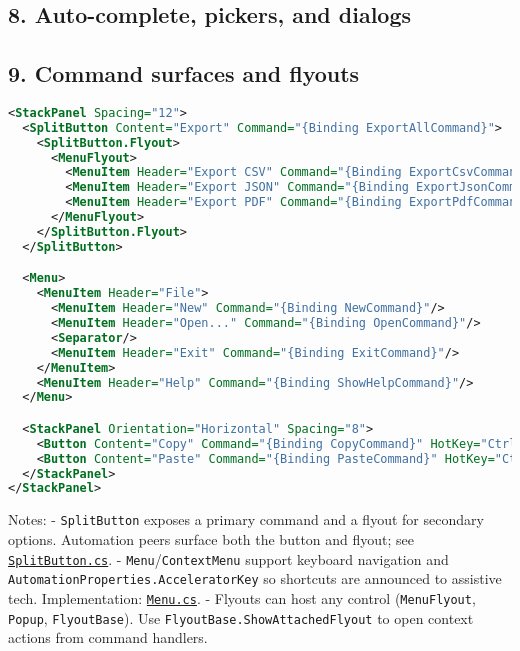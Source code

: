 \subsection{8. Auto-complete, pickers, and
dialogs}\label{auto-complete-pickers-and-dialogs}

\subsection{9. Command surfaces and
flyouts}\label{command-surfaces-and-flyouts}

\begin{lstlisting}[language=XML]
<StackPanel Spacing="12">
  <SplitButton Content="Export" Command="{Binding ExportAllCommand}">
    <SplitButton.Flyout>
      <MenuFlyout>
        <MenuItem Header="Export CSV" Command="{Binding ExportCsvCommand}"/>
        <MenuItem Header="Export JSON" Command="{Binding ExportJsonCommand}"/>
        <MenuItem Header="Export PDF" Command="{Binding ExportPdfCommand}"/>
      </MenuFlyout>
    </SplitButton.Flyout>
  </SplitButton>

  <Menu>
    <MenuItem Header="File">
      <MenuItem Header="New" Command="{Binding NewCommand}"/>
      <MenuItem Header="Open..." Command="{Binding OpenCommand}"/>
      <Separator/>
      <MenuItem Header="Exit" Command="{Binding ExitCommand}"/>
    </MenuItem>
    <MenuItem Header="Help" Command="{Binding ShowHelpCommand}"/>
  </Menu>

  <StackPanel Orientation="Horizontal" Spacing="8">
    <Button Content="Copy" Command="{Binding CopyCommand}" HotKey="Ctrl+C"/>
    <Button Content="Paste" Command="{Binding PasteCommand}" HotKey="Ctrl+V"/>
  </StackPanel>
</StackPanel>
\end{lstlisting}

Notes: - \passthrough{\lstinline!SplitButton!} exposes a primary command
and a flyout for secondary options. Automation peers surface both the
button and flyout; see
\href{https://github.com/AvaloniaUI/Avalonia/blob/master/src/Avalonia.Controls/SplitButton/SplitButton.cs}{\passthrough{\lstinline!SplitButton.cs!}}.
- \passthrough{\lstinline!Menu!}/\passthrough{\lstinline!ContextMenu!}
support keyboard navigation and
\passthrough{\lstinline!AutomationProperties.AcceleratorKey!} so
shortcuts are announced to assistive tech. Implementation:
\href{https://github.com/AvaloniaUI/Avalonia/blob/master/src/Avalonia.Controls/Menu.cs}{\passthrough{\lstinline!Menu.cs!}}.
- Flyouts can host any control (\passthrough{\lstinline!MenuFlyout!},
\passthrough{\lstinline!Popup!}, \passthrough{\lstinline!FlyoutBase!}).
Use \passthrough{\lstinline!FlyoutBase.ShowAttachedFlyout!} to open
context actions from command handlers.

